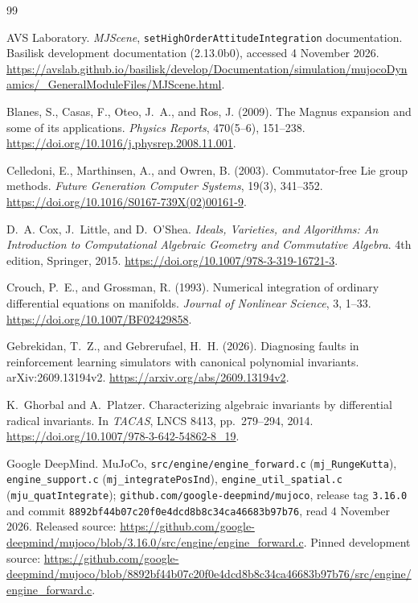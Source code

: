 \documentclass[10pt]{article}
\theoremstyle{definition}
\begin{document}
\FloatBarrier

\begin{thebibliography}{99}

AVS Laboratory.
\newblock \emph{MJScene},
\texttt{setHighOrderAttitudeIntegration} documentation.
\newblock Basilisk development documentation (2.13.0b0), accessed 4 November 2026.
\newblock \url{https://avslab.github.io/basilisk/develop/Documentation/simulation/mujocoDynamics/_GeneralModuleFiles/MJScene.html}.

Blanes, S., Casas, F., Oteo, J.~A., and Ros, J. (2009). The Magnus expansion and
some of its applications. \emph{Physics Reports}, 470(5--6), 151--238.
\newblock \url{https://doi.org/10.1016/j.physrep.2008.11.001}.

Celledoni, E., Marthinsen, A., and Owren, B. (2003). Commutator-free Lie group
methods. \emph{Future Generation Computer Systems}, 19(3), 341--352.
\newblock \url{https://doi.org/10.1016/S0167-739X(02)00161-9}.

D.~A. Cox, J.~Little, and D.~O'Shea.
\newblock \emph{Ideals, Varieties, and Algorithms: An Introduction to
Computational Algebraic Geometry and Commutative Algebra}.
\newblock 4th edition, Springer, 2015.
\newblock \url{https://doi.org/10.1007/978-3-319-16721-3}.

Crouch, P.~E., and Grossman, R. (1993). Numerical integration of ordinary
differential equations on manifolds. \emph{Journal of Nonlinear Science}, 3, 1--33.
\newblock \url{https://doi.org/10.1007/BF02429858}.

Gebrekidan, T.~Z., and Gebrerufael, H.~H. (2026).
Diagnosing faults in reinforcement learning simulators
with canonical polynomial invariants. arXiv:2609.13194v2.
\newblock \url{https://arxiv.org/abs/2609.13194v2}.

K.~Ghorbal and A.~Platzer.
\newblock Characterizing algebraic invariants by differential radical invariants.
\newblock In \emph{TACAS}, LNCS 8413, pp.~279--294, 2014.
\newblock \url{https://doi.org/10.1007/978-3-642-54862-8_19}.

\raggedright Google DeepMind. MuJoCo, \texttt{src/engine/engine\_forward.c}
(\texttt{mj\_RungeKutta}), \texttt{engine\_support.c}
(\texttt{mj\_integratePosInd}), \texttt{engine\_util\_spatial.c}
(\texttt{mju\_quatIntegrate}); \texttt{github.com/google-deepmind/mujoco}, release tag \texttt{3.16.0} and
commit \texttt{8892bf44b07c20f0e4dcd8b8c34ca46683b97b76}, read 4 November 2026.
\newblock Released source:
\url{https://github.com/google-deepmind/mujoco/blob/3.16.0/src/engine/engine_forward.c}.
\newblock Pinned development source:
\url{https://github.com/google-deepmind/mujoco/blob/8892bf44b07c20f0e4dcd8b8c34ca46683b97b76/src/engine/engine_forward.c}.


\end{thebibliography}
\end{document}
